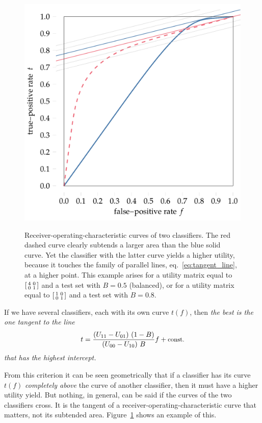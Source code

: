 \documentclass[\ifafour a4paper,12pt,\else a5paper,10pt,\fi%
onecolumn,oneside,article,%
british%
]{memoir}
\theoremstyle{remark}
\theoremstyle{innote}
\renewcommand*{\|}[1][]{\nonscript\:#1\vert\nonscript\:\mathopen{}}
\newcommand*{\eqn}{eq.}%
\newcommand*{\sumatrix}[4]{\begin{bsmallmatrix*}[r]#1&#2\\#3&#4\end{bsmallmatrix*}}
\begin{document}
%
\begin{figure}[!b]
  \centering
    \includegraphics[width=0.66\linewidth]{auc_example.pdf}\\
    \caption{Receiver-operating-characteristic curves of two classifiers. The {\color{red}red dashed curve} clearly subtends a larger area than the {\color{blue}blue solid curve}. Yet the classifier with the latter curve yields a higher utility, because it touches the family of parallel lines, \eqn~\eqref{eq:tangent_line}, at a higher point. This example arises for a utility matrix equal to $\sumatrix{ 4}{0}{0}{1 }$ and a test set with $B=0.5$ (balanced), or for a utility matrix equal to $\sumatrix{ 1}{0}{0}{1 }$ and a test set with $B=0.8$.}
  \label{fig:auc_example}
\end{figure}%
%
If we have several classifiers, each with its own curve $t(f)$, then \emph{the best is the one tangent to the line
\begin{equation}
  \label{eq:tangent_line}
  t = \frac{(U_{11} - U_{01})\ (1-B)}{(U_{00} - U_{10})\  B} f + \text{\normalfont\small const.}
\end{equation}
that has the highest intercept.}

From this criterion it can be seen geometrically that if a classifier has its curve $t(f)$ \emph{completely above} the curve of another classifier, then it must have a higher utility yield. But nothing, in general, can be said if the curves of the two classifiers cross. It is the tangent of a receiver-operating-characteristic curve that matters, not its subtended area. Figure~\ref{fig:auc_example} shows an example of this.
\end{document}
